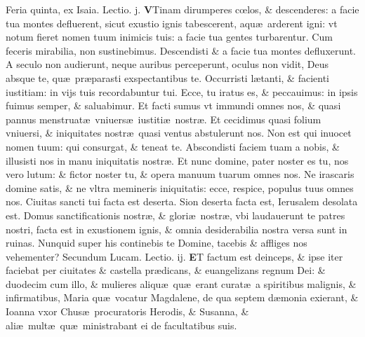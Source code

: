 \documentclass[a5paper,10pt]{book}
\def\leftmarginnote{%
	\lrmarginnote{\hskip -\marginparsep \hskip -6.5em}}
\def\rightmarginnote{%
	\lrmarginnote{\hskip\columnwidth \hskip -1em}}
\def\ae{æ}
\def\oe{œ}
\begin{document}
\begin{multicols*}{2}
\newline {} \color{red} \hypertarget{THU-TERTIA-ADV}{Feria quinta,} ex Isaia. \hfill Lectio. j. \color{black}
\vspace{-.25em}
\lettrine[lines=2]{\bfseries V}{}Tinam\rightmarginnote{c. 64.} dirumperes c\oe los, \& descenderes: a facie tua montes defluerent, sicut exustio ignis tabescerent, aqu\ae \ arderent igni: vt notum fieret nomen tuum inimicis tuis: a facie tua gentes turbarentur.
Cum feceris mirabilia, non sustinebimus. Descendisti \& a facie tua montes defluxerunt.
A seculo non audierunt, neque auribus perceperunt, oculus non vidit, Deus absque te, qu\ae \ pr\ae parasti exspectantibus te.
Occurristi l\ae tanti, \& facienti iustitiam: in vijs tuis recordabuntur tui.
Ecce, tu iratus es, \& peccauimus: in ipsis fuimus semper, \& saluabimur.
Et facti sumus vt immundi omnes nos, \& quasi pannus menstruat\ae \ vniuers\ae \ iustiti\ae \ nostr\ae .
Et cecidimus quasi folium vniuersi, \& iniquitates nostr\ae \ quasi ventus abstulerunt nos.
Non est qui inuocet nomen tuum: qui consurgat, \& teneat te.
Abscondisti faciem tuam a nobis, \& illusisti nos in manu iniquitatis nostr\ae .
Et nunc domine, pater noster es tu, nos vero lutum: \& fictor noster tu, \& opera manuum tuarum omnes nos. 
Ne irascaris domine satis, \& ne vltra memineris iniquitatis: ecce, respice, populus tuus omnes nos.
Ciuitas sancti tui facta est deserta. Sion deserta facta est, Ierusalem desolata est.
Domus sanctificationis nostr\ae , \& glori\ae \ nostr\ae , vbi laudauerunt te patres nostri, facta
est in exustionem ignis, \& omnia desiderabilia nostra versa sunt in ruinas.
Nunquid super his continebis te Domine, tacebis \& affliges nos vehementer?
\fancyhead[C]{\color{red} Feria. v. Dominic\ae . iij. aduentus}
\newline \color{red} Secundum Lucam. \hfill Lectio. ij. \color{black}
\vspace{-.25em}
\lettrine[lines=2]{\bfseries \color{red} E}{}T\leftmarginnote{\begin{flushright}ca. 8.\end{flushright}} factum est deinceps, \& ipse iter faciebat per ciuitates \& castella pr\ae dicans, \& euangelizans regnum Dei: \& duodecim cum illo, \& mulieres aliqu\ae \ qu\ae \ erant curat\ae \ a spiritibus malignis, \& infirmatibus, Maria qu\ae \ vocatur Magdalene, de qua septem d\ae monia exierant, \& Ioanna vxor Chus\ae \ procuratoris Herodis, \& Susanna, \& ali\ae \ mult\ae \ qu\ae \ ministrabant ei de facultatibus suis. \textdagger \ 

\end{multicols*}
\end{document}
